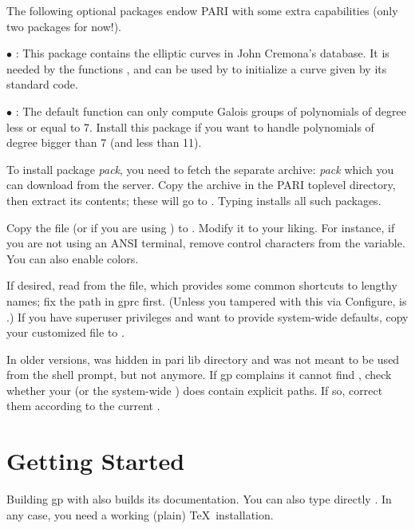  The following optional packages endow PARI with some
extra capabilities (only two packages for now!).

$\bullet$ : This package contains the elliptic curves in
John Cremona's database. It is needed by the functions ,
 and can be used by  to initialize a curve
given by its standard code.

$\bullet$ : The default  function can only
compute Galois groups of polynomials of degree less or equal to 7. Install
this package if you want to handle polynomials of degree bigger than 7 (and
less than 11). \medskip

To install package \emph{pack}, you need to fetch the separate archive:
\emph{pack} which you can download from the  server.
Copy the archive in the PARI toplevel directory, then extract its
contents; these will go to . Typing  installs all such packages.

 Copy the file  (or
 if you are using ) to . Modify
it to your liking. For instance, if you are not using an ANSI terminal,
remove control characters from the  variable. You can also
enable colors. 

If desired, read   from the 
file, which provides some common shortcuts to lengthy names; fix the path in
gprc first. (Unless you tampered with this via Configure,  is
.) If you have superuser privileges and want to
provide system-wide defaults, copy your customized  file to
.

In older versions,  was hidden in pari lib directory and was not
meant to be used from the shell prompt, but not anymore. If gp complains it
cannot find , check whether your  (or the system-wide
) does contain explicit paths. If so, correct them according to the
current .

\section{Getting Started}

 Building gp with  also builds
its documentation. You can also type directly . In any case,
you need a working (plain) \TeX\ installation.


